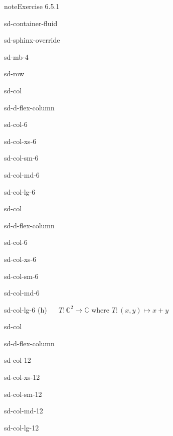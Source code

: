 \documentclass[letterpaper,10pt,english]{jupyterBook}
\begin{document}
\begin{sphinxadmonition}{note}{Exercise 6.5.1}
\begin{sphinxuseclass}{sd-container-fluid}
\begin{sphinxuseclass}{sd-sphinx-override}
\begin{sphinxuseclass}{sd-mb-4}
\begin{sphinxuseclass}{sd-row}
\begin{sphinxuseclass}{sd-col}
\begin{sphinxuseclass}{sd-d-flex-column}
\begin{sphinxuseclass}{sd-col-6}
\begin{sphinxuseclass}{sd-col-xs-6}
\begin{sphinxuseclass}{sd-col-sm-6}
\begin{sphinxuseclass}{sd-col-md-6}
\begin{sphinxuseclass}{sd-col-lg-6}
\end{sphinxuseclass}
\end{sphinxuseclass}
\end{sphinxuseclass}
\end{sphinxuseclass}
\end{sphinxuseclass}
\end{sphinxuseclass}
\end{sphinxuseclass}
\begin{sphinxuseclass}{sd-col}
\begin{sphinxuseclass}{sd-d-flex-column}
\begin{sphinxuseclass}{sd-col-6}
\begin{sphinxuseclass}{sd-col-xs-6}
\begin{sphinxuseclass}{sd-col-sm-6}
\begin{sphinxuseclass}{sd-col-md-6}
\begin{sphinxuseclass}{sd-col-lg-6}
\sphinxAtStartPar
(h)   \(T: \mathbb{C}^2 \to \mathbb{C}\) where \(T: (x, y) \mapsto x + y\)

\end{sphinxuseclass}
\end{sphinxuseclass}
\end{sphinxuseclass}
\end{sphinxuseclass}
\end{sphinxuseclass}
\end{sphinxuseclass}
\end{sphinxuseclass}
\begin{sphinxuseclass}{sd-col}
\begin{sphinxuseclass}{sd-d-flex-column}
\begin{sphinxuseclass}{sd-col-12}
\begin{sphinxuseclass}{sd-col-xs-12}
\begin{sphinxuseclass}{sd-col-sm-12}
\begin{sphinxuseclass}{sd-col-md-12}
\begin{sphinxuseclass}{sd-col-lg-12}
\sphinxAtStartPar
 


\end{sphinxuseclass}
\end{sphinxuseclass}
\end{sphinxuseclass}
\end{sphinxuseclass}
\end{sphinxuseclass}
\end{sphinxuseclass}
\end{sphinxuseclass}
\end{sphinxuseclass}
\end{sphinxuseclass}
\end{sphinxuseclass}
\end{sphinxuseclass}
\end{sphinxadmonition}
\end{document}
